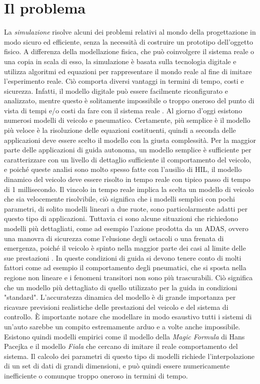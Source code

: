 \section{Il problema}
La \textit{simulazione} risolve alcuni dei problemi relativi al mondo della progettazione in modo sicuro ed efficiente, senza la necessità di costruire un prototipo dell'oggetto fisico. A differenza della modellazione fisica, che può coinvolgere il sistema reale o una copia in scala di esso, la simulazione è basata sulla tecnologia digitale e utilizza algoritmi ed equazioni per rappresentare il mondo reale al fine di imitare l'esperimento reale. Ciò comporta diversi vantaggi in termini di tempo, costi e sicurezza. Infatti, il modello digitale può essere facilmente riconfigurato e analizzato, mentre questo è solitamente impossibile o troppo oneroso del punto di vista di tempi e/o costi da fare con il sistema reale \cite{Anu}. Al giorno d'oggi esistono numerosi modelli di veicolo e pneumatico. Certamente, più semplice è il modello più veloce è la risoluzione delle equazioni costituenti, quindi a seconda delle applicazioni deve essere scelto il modello con la giusta complessità. Per la maggior parte delle applicazioni di guida autonoma, un modello semplice è sufficiente per caratterizzare con un livello di dettaglio sufficiente il comportamento del veicolo, e poiché queste analisi sono molto spesso fatte con l'ausilio di \ac{HIL}, il modello dinamico del veicolo deve essere risolto in tempo reale con tipico passo di tempo di 1 millisecondo. Il vincolo in tempo reale implica la scelta un modello di veicolo che sia velocemente risolvibile, ciò significa che i modelli semplici con pochi parametri, di solito modelli lineari a due ruote, sono particolarmente adatti per questo tipo di applicazioni. Tuttavia ci sono alcune situazioni che richiedono modelli più dettagliati, come ad esempio l'azione prodotta da un \ac{ADAS}, ovvero una manovra di sicurezza come l'elusione degli ostacoli o una frenata di emergenza, poiché il veicolo è spinto nella maggior parte dei casi al limite delle sue prestazioni \cite{impacts}. In queste condizioni di guida si devono tenere conto di molti fattori come ad esempio il comportamento degli pneumatici, che si sposta nella regione non lineare e i fenomeni transitori non sono più trascurabili. Ciò significa che un modello più dettagliato di quello utilizzato per la guida in condizioni "standard". L'accuratezza dinamica del modello è di grande importanza per ricavare previsioni realistiche delle prestazioni del veicolo e del sistema di controllo. È importante notare che modellare in modo esaustivo tutti i sistemi di un'auto sarebbe un compito estremamente arduo e a volte anche impossibile. Esistono quindi modelli empirici come il modello della \textit{Magic Formula} di Hans Pacejka e il modello \textit{Fiala} che cercano di imitare il reale comportamento del sistema. Il calcolo dei parametri di questo tipo di modelli richiede l'interpolazione di un set di dati di grandi dimensioni, e può quindi essere numericamente inefficiente o comunque troppo oneroso in termini di tempo.\\
